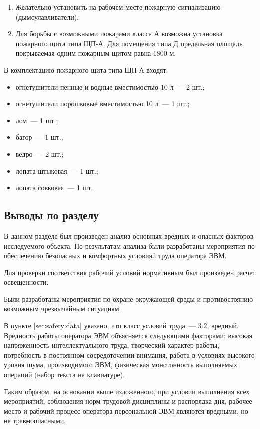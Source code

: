 \begin{enumerate}
\item Желательно установить на рабочем месте пожарную сигнализацию (дымоулавливатели).
\item Для борьбы с возможными пожарами класса А возможна установка пожарного щита типа ЩП-А.
  Для помещения типа Д предельная площадь покрываемая одним пожарным щитом равна 1800 м.
\end{enumerate}

В комплектацию пожарного щита типа ЩП-А входят:
\begin{itemize}
  \item огнетушители пенные и водные вместимостью 10 л~--- 2 шт.;
  \item огнетушители порошковые вместимостью 10 л~--- 1 шт.;
  \item лом~--- 1 шт.;
  \item багор~--- 1 шт.;
  \item ведро~--- 2 шт.;
  \item лопата штыковая~--- 1 шт.;
  \item лопата совковая~--- 1 шт.
\end{itemize}

\subsection{Выводы по разделу}
В данном разделе был произведен анализ основных вредных и опасных факторов исследуемого объекта.
По результатам анализа были разработаны мероприятия по обеспечению безопасных и комфортных условияй труда оператора ЭВМ.

Для проверки соответствия рабочий условий нормативным был произведен расчет освещенности.

Были разработаны мероприятия по охране окружающей среды и противостоянию возможным чрезвычайным ситуациям.

В пункте \ref{sec:safety:data} указано, что класс условий труда~--- 3.2, вредный.
Вредность работы оператора ЭВМ объясняется следующими факторами: высокая напряженность интеллектуального труда, творческий характер работы, потребность в постоянном сосредоточении внимания, работа в условиях высокого уровня шума, производимого ЭВМ, физическая монотонность выполняемых операций (набор текста на клавиатуре).

Таким образом, на основании выше изложенного, при условии выполнения всех мероприятий, соблюдения норм трудовой дисциплины и распорядка дня, рабочее место и рабочий процесс оператора персональной ЭВМ являются вредными, но не травмоопасными.